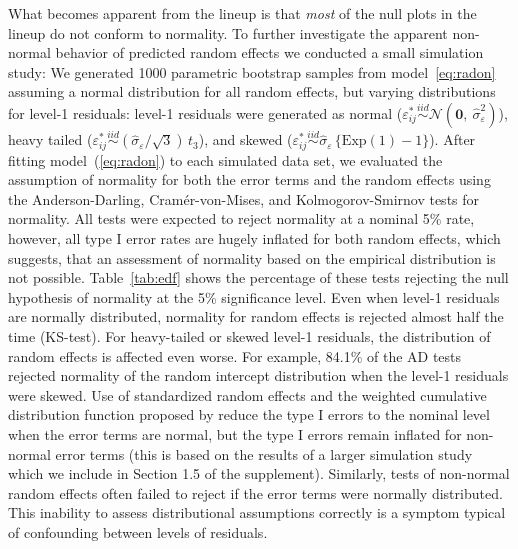\documentclass[12pt]{article} %
\newcommand{\hh}[1]{{\color{orange} #1}}
\begin{document}
What becomes apparent from the lineup is that {\it most} of the null plots in the lineup do not conform to normality. To further investigate the apparent non-normal behavior of predicted random effects we conducted a small simulation study: 
%
We generated 1000 parametric bootstrap samples from model~\eqref{eq:radon} assuming a normal distribution for all random effects, but  varying distributions for  level-1 residuals:  level-1 residuals were generated as normal ($\varepsilon_{ij}^* \overset{iid}{\sim}  \mathcal{N}(\bm{0},\ \widehat{\sigma}^2_\varepsilon)$), heavy tailed ($\varepsilon_{ij}^* \overset{iid}{\sim} (\widehat{\sigma}_{\varepsilon} / \sqrt{3})\, t_3$), and skewed ($\varepsilon_{ij}^* \overset{iid}{\sim} \widehat{\sigma}_{\varepsilon} \, \{ \text{Exp}(1) - 1 \}$).
After fitting model~(\ref{eq:radon}) to each simulated data set, we evaluated the assumption of normality for both the error terms and 
the random effects using the Anderson-Darling, Cram{\'e}r-von-Mises, and  Kolmogorov-Smirnov tests for normality.  All tests were expected to reject normality at a nominal 5\% rate, however, all type I error rates are hugely inflated for both random effects, which suggests, that  an assessment of normality based on the empirical distribution is not possible. 
%
Table~\ref{tab:edf} shows the percentage of these tests rejecting the null hypothesis of normality at the 5\% significance level.
Even when level-1 residuals are normally distributed, normality for random effects is rejected almost half the time (KS-test). For heavy-tailed or skewed level-1 residuals, the distribution of random effects is affected even worse. 
%
For example, 84.1\% of the AD tests rejected normality of the random intercept distribution when the level-1 residuals were skewed.
 Use of standardized random effects and the weighted cumulative distribution function proposed by \cite{Lange:1989uu} reduce the type I errors to the nominal level when the error terms are normal, but the type I errors remain inflated for non-normal error terms (this is based on the results of a larger simulation study which we include in Section 1.5 of the supplement).  
Similarly, tests of non-normal random effects often failed to reject if the error terms were normally distributed. %
This inability to assess distributional assumptions correctly is a symptom typical of confounding between levels of residuals.
\end{document}
